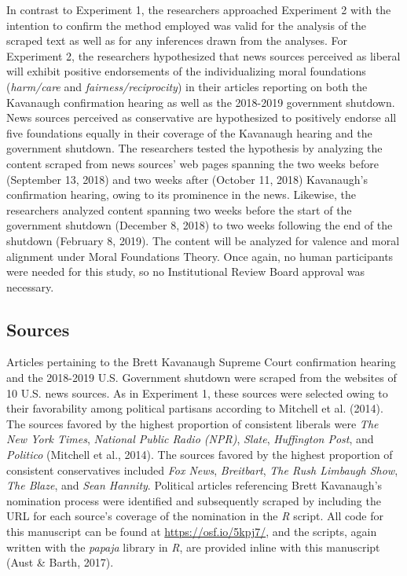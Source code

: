\documentclass[english,,man]{apa6}
\begin{document}
In contrast to Experiment 1, the researchers approached Experiment 2
with the intention to confirm the method employed was valid for the
analysis of the scraped text as well as for any inferences drawn from
the analyses. For Experiment 2, the researchers hypothesized that news
sources perceived as liberal will exhibit positive endorsements of the
individualizing moral foundations (\emph{harm/care} and
\emph{fairness/reciprocity}) in their articles reporting on both the
Kavanaugh confirmation hearing as well as the 2018-2019 government
shutdown. News sources perceived as conservative are hypothesized to
positively endorse all five foundations equally in their coverage of the
Kavanaugh hearing and the government shutdown. The researchers tested
the hypothesis by analyzing the content scraped from news sources' web
pages spanning the two weeks before (September 13, 2018) and two weeks
after (October 11, 2018) Kavanaugh's confirmation hearing, owing to its
prominence in the news. Likewise, the researchers analyzed content
spanning two weeks before the start of the government shutdown (December
8, 2018) to two weeks following the end of the shutdown (February 8,
2019). The content will be analyzed for valence and moral alignment
under Moral Foundations Theory. Once again, no human participants were
needed for this study, so no Institutional Review Board approval was
necessary.

\subsection{Sources}\label{sources-1}

Articles pertaining to the Brett Kavanaugh Supreme Court confirmation
hearing and the 2018-2019 U.S. Government shutdown were scraped from the
websites of 10 U.S. news sources. As in Experiment 1, these sources were
selected owing to their favorability among political partisans according
to Mitchell et al. (2014). The sources favored by the highest proportion
of consistent liberals were \emph{The New York Times}, \emph{National
Public Radio (NPR)}, \emph{Slate}, \emph{Huffington Post}, and
\emph{Politico} (Mitchell et al., 2014). The sources favored by the
highest proportion of consistent conservatives included \emph{Fox News},
\emph{Breitbart}, \emph{The Rush Limbaugh Show}, \emph{The Blaze}, and
\emph{Sean Hannity}. Political articles referencing Brett Kavanaugh's
nomination process were identified and subsequently scraped by including
the URL for each source's coverage of the nomination in the \emph{R}
script. All code for this manuscript can be found at
\url{https://osf.io/5kpj7/}, and the scripts, again written with the
\emph{papaja} library in \emph{R}, are provided inline with this
manuscript (Aust \& Barth, 2017).
\end{document}
